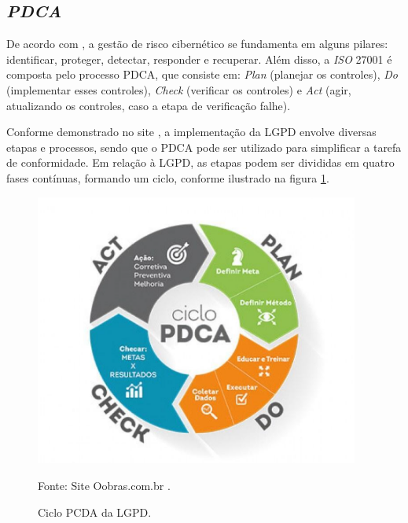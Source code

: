 \documentclass[
	12pt,				%
	openright,			%
	oneside,			%
	a4paper,			%
	english,			%
	french,				%
	spanish,			%
	brazil,				%
	]{abntex2}
\begin{document}
\subsection{ \textit{PDCA} }

De acordo com , a gestão de risco cibernético se fundamenta em alguns pilares: identificar, proteger, detectar, responder e recuperar. Além disso, a \textit{ISO} 27001 é composta pelo processo PDCA, que consiste em: \textit{Plan} (planejar os controles), \textit{Do} (implementar esses controles), \textit{Check} (verificar os controles) e \textit{Act} (agir, atualizando os controles, caso a etapa de verificação falhe).

Conforme demonstrado no site , a implementação da LGPD envolve diversas etapas e processos, sendo que o PDCA pode ser utilizado para simplificar a tarefa de conformidade. Em relação à LGPD, as etapas podem ser divididas em quatro fases contínuas, formando um ciclo, conforme ilustrado na figura \ref{fig: PCDA}.


\begin{figure}[ht]
    \centering
    \caption{Ciclo PCDA da LGPD.}
    \includegraphics[width=4.2in]{Images/05PCDA.png}
    
    \label{fig: PCDA}
    \centering \small Fonte: Site Oobras.com.br \cite{oobras}.
\end{figure}
\end{document}
